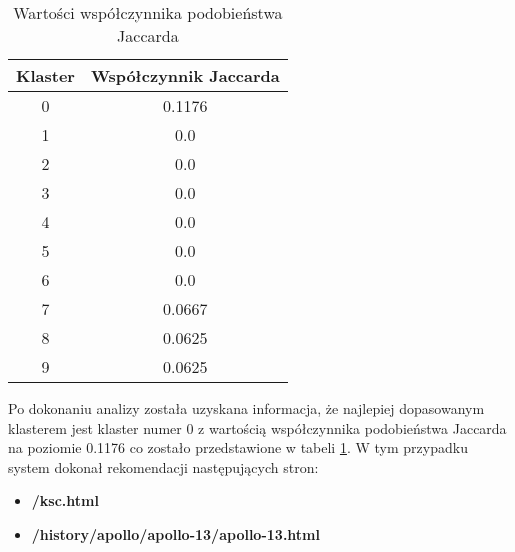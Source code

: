 \documentclass[../EDI_Task3_Karwowski_Kowalewski.tex]{subfiles}
\begin{document}
{{        \begin{table}[!htbp]
            \small
            \centering
            \begin{tabular}{|c|c|}
                \hline
                Klaster & Współczynnik Jaccarda \\ \hline
                0 & 0.1176 \\
                1 & 0.0 \\
                2 & 0.0 \\
                3 & 0.0 \\
                4 & 0.0 \\
                5 & 0.0 \\
                6 & 0.0 \\
                7 & 0.0667 \\
                8 & 0.0625 \\
                9 & 0.0625 \\ \hline
            \end{tabular}
            \caption{Wartości współczynnika podobieństwa Jaccarda}
            \label{coeffcient_10}
        \end{table}
        \FloatBarrier

        Po dokonaniu analizy została uzyskana informacja, że najlepiej dopasowanym
        klasterem jest klaster numer 0 z wartością współczynnika podobieństwa Jaccarda
        na poziomie 0.1176 co zostało przedstawione w tabeli \ref{coeffcient_10}. W tym
        przypadku system dokonał rekomendacji następujących stron:
        \begin{itemize}
            \item \textbf{/ksc.html}
            \item \textbf{/history/apollo/apollo-13/apollo-13.html}
        \end{itemize}
    }
}
\end{document}
